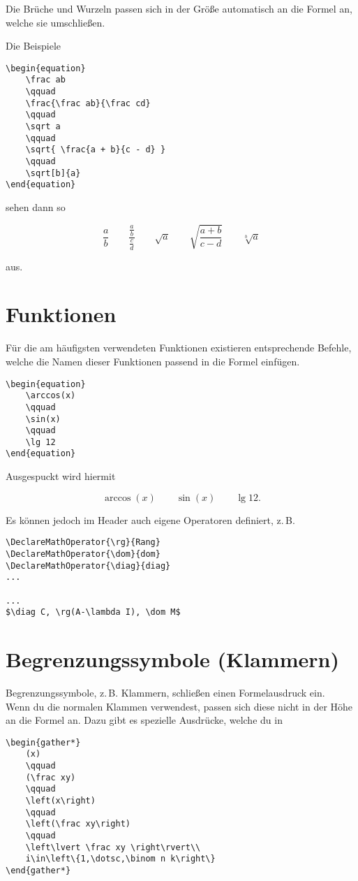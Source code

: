 Die Brüche und Wurzeln passen sich in der Größe automatisch an die Formel an, welche sie umschließen.

Die Beispiele
\begin{lstlisting}
\begin{equation}
	\frac ab
	\qquad
	\frac{\frac ab}{\frac cd}
	\qquad
	\sqrt a
	\qquad
	\sqrt{ \frac{a + b}{c - d} }
	\qquad
	\sqrt[b]{a}
\end{equation}
\end{lstlisting} 

sehen dann so

\begin{equation}
	\frac ab
	\qquad
	\frac{\frac ab}{\frac cd}
	\qquad
	\sqrt a
	\qquad
	\sqrt{ \frac{a + b}{c - d} }
	\qquad
	\sqrt[b]{a}
\end{equation}

aus.

\section{Funktionen}

Für die am häufigsten verwendeten Funktionen existieren entsprechende Befehle, welche die Namen dieser Funktionen passend in die Formel einfügen.
\begin{lstlisting}
\begin{equation}
	\arccos(x)
	\qquad
	\sin(x)
	\qquad
	\lg 12
\end{equation}
\end{lstlisting} 

Ausgespuckt wird hiermit

\begin{equation}
	\arccos(x)
	\qquad
	\sin(x)
	\qquad
	\lg 12.
\end{equation}

Es können jedoch im Header auch eigene Operatoren definiert, z.\,B.
\begin{lstlisting}
\DeclareMathOperator{\rg}{Rang}
\DeclareMathOperator{\dom}{dom}
\DeclareMathOperator{\diag}{diag}
...

...
$\diag C, \rg(A-\lambda I), \dom M$
\end{lstlisting}

\section{Begrenzungssymbole (Klammern)}

Begrenzungssymbole, z.\,B. Klammern, schließen einen Formelausdruck ein.\\
Wenn du die normalen Klammen verwendest, passen sich diese nicht in der Höhe an die Formel an. Dazu gibt es spezielle Ausdrücke, welche du in
\begin{lstlisting}
\begin{gather*}
	(x)
	\qquad
	(\frac xy)
	\qquad
	\left(x\right)
	\qquad
	\left(\frac xy\right)
	\qquad
	\left\lvert \frac xy \right\rvert\\
	i\in\left\{1,\dotsc,\binom n k\right\}
\end{gather*}
\end{lstlisting} 

